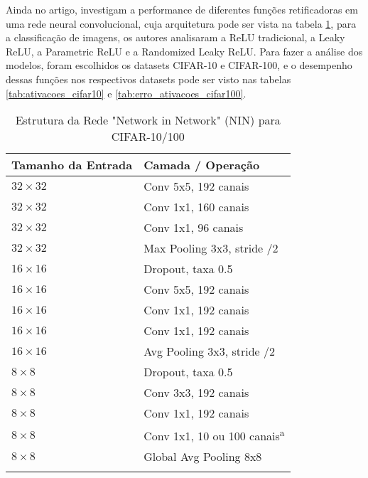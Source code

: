 Ainda no artigo, \textcite{XuRReLU} investigam a performance de diferentes funções retificadoras em uma rede neural convolucional, cuja arquitetura pode ser vista na tabela \ref{tab:nin_arquitetura}, para a classificação de imagens, os autores analisaram a ReLU tradicional, a Leaky ReLU, a Parametric ReLU e a Randomized Leaky ReLU. Para fazer a análise dos modelos, foram escolhidos os datasets CIFAR-10 e CIFAR-100, e o desempenho dessas funções nos respectivos datasets pode ser visto nas tabelas \ref{tab:ativacoes_cifar10} e \ref{tab:erro_ativacoes_cifar100}.

\begin{table}[ht]
    \centering
    \begin{threeparttable}
        \caption{Estrutura da Rede "Network in Network" (NIN) para CIFAR-10/100}
        \label{tab:nin_arquitetura}
        \begin{tabular}{ll}
            \toprule
            \textbf{Tamanho da Entrada} & \textbf{Camada / Operação} \\
            \midrule
            
            $32 \times 32$ & Conv 5x5, 192 canais \\
            $32 \times 32$ & Conv 1x1, 160 canais \\
            $32 \times 32$ & Conv 1x1, 96 canais \\
            $32 \times 32$ & Max Pooling 3x3, stride /2 \\
            \addlinespace %
            
            $16 \times 16$ & Dropout, taxa 0.5 \\
            $16 \times 16$ & Conv 5x5, 192 canais \\
            $16 \times 16$ & Conv 1x1, 192 canais \\
            $16 \times 16$ & Conv 1x1, 192 canais \\
            $16 \times 16$ & Avg Pooling 3x3, stride /2 \\
            \addlinespace
            
            $8 \times 8$ & Dropout, taxa 0.5 \\
            $8 \times 8$ & Conv 3x3, 192 canais \\
            $8 \times 8$ & Conv 1x1, 192 canais \\
            $8 \times 8$ & Conv 1x1, 10 ou 100 canais\textsuperscript{a} \\
            $8 \times 8$ & Global Avg Pooling 8x8 \\
            \addlinespace
            

\end{tabular}
\end{threeparttable}
\end{table}
